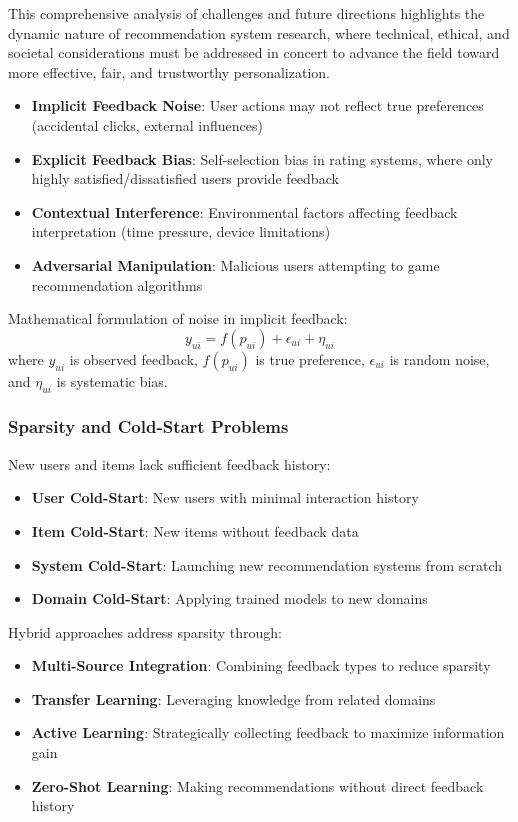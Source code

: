 This comprehensive analysis of challenges and future directions highlights the dynamic nature of recommendation system research, where technical, ethical, and societal considerations must be addressed in concert to advance the field toward more effective, fair, and trustworthy personalization.

\begin{itemize}
    \item \textbf{Implicit Feedback Noise}: User actions may not reflect true preferences (accidental clicks, external influences)
    \item \textbf{Explicit Feedback Bias}: Self-selection bias in rating systems, where only highly satisfied/dissatisfied users provide feedback
    \item \textbf{Contextual Interference}: Environmental factors affecting feedback interpretation (time pressure, device limitations)
    \item \textbf{Adversarial Manipulation}: Malicious users attempting to game recommendation algorithms
\end{itemize}

Mathematical formulation of noise in implicit feedback:
\begin{equation}
y_{ui} = f(p_{ui}) + \epsilon_{ui} + \eta_{ui}
\end{equation}
where $y_{ui}$ is observed feedback, $f(p_{ui})$ is true preference, $\epsilon_{ui}$ is random noise, and $\eta_{ui}$ is systematic bias.

\subsubsection{Sparsity and Cold-Start Problems}

New users and items lack sufficient feedback history:

\begin{itemize}
    \item \textbf{User Cold-Start}: New users with minimal interaction history
    \item \textbf{Item Cold-Start}: New items without feedback data
    \item \textbf{System Cold-Start}: Launching new recommendation systems from scratch
    \item \textbf{Domain Cold-Start}: Applying trained models to new domains
\end{itemize}

Hybrid approaches address sparsity through:
\begin{itemize}
    \item \textbf{Multi-Source Integration}: Combining feedback types to reduce sparsity
    \item \textbf{Transfer Learning}: Leveraging knowledge from related domains
    \item \textbf{Active Learning}: Strategically collecting feedback to maximize information gain
    \item \textbf{Zero-Shot Learning}: Making recommendations without direct feedback history
\end{itemize}

